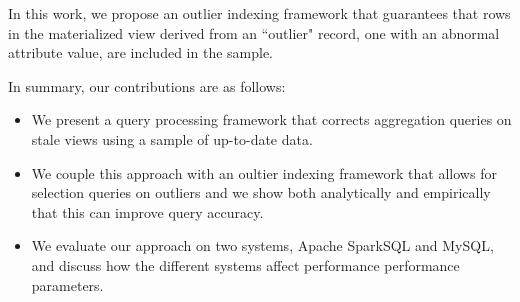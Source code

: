 In this work, we propose an outlier indexing framework that guarantees that
rows in the materialized view derived from an ``outlier" record, one with
an abnormal attribute value, are included in the sample.

In summary, our contributions are as follows:
\begin{itemize}
\item We present a query processing framework that corrects aggregation queries on stale
views using a sample of up-to-date data.
\item We couple this approach with an oultier indexing framework that allows
for selection queries on outliers and we show both analytically and empirically that 
this can improve query accuracy.
\item We evaluate our approach on two systems, Apache SparkSQL and MySQL,
and discuss how the different systems affect performance performance
parameters.
\end{itemize}
\fi
